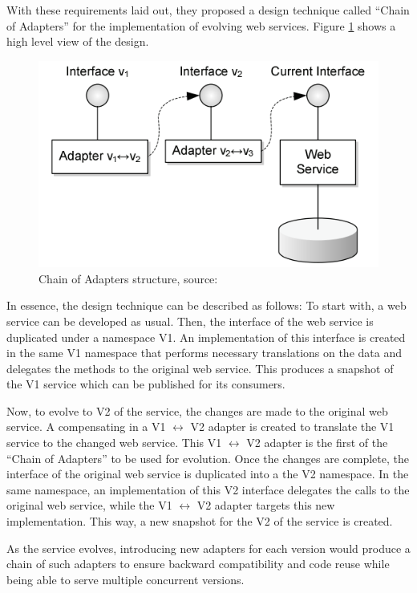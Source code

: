 \documentclass[runningheads,a4paper]{llncs}
\begin{document}
With these requirements laid out, they proposed a design technique called ``Chain of Adapters'' for the implementation of evolving web services. Figure \ref{fig:chain_of_adapters} shows a high level view of the design.

\begin{figure}[ht]
  \centering
  \includegraphics[scale=0.4]{chain_of_adapters.png}
    \caption{Chain of Adapters structure, source: \cite{kaminski2006design}}
  \label{fig:chain_of_adapters}
\end{figure}

In essence, the design technique can be described as follows: To start with, a web service can be developed as usual. Then, the interface of the web service is duplicated under a namespace V1. An implementation of this interface is created in the same V1 namespace that performs necessary translations on the data and delegates the methods to the original web service. This produces a snapshot of the V1 service which can be published for its consumers.

Now, to evolve to V2 of the service, the changes are made to the original web service. A compensating in a V1 $\leftrightarrow$ V2 adapter is created to translate the V1 service to the changed web service. This V1 $\leftrightarrow$ V2 adapter is the first of the ``Chain of Adapters'' to be used for evolution. Once the changes are complete, the interface of the original web service is duplicated into a the V2 namespace. In the same namespace, an implementation of this V2 interface delegates the calls to the original web service, while the V1 $\leftrightarrow$ V2 adapter targets this new implementation. This way, a new snapshot for the V2 of the service is created.

As the service evolves, introducing new adapters for each version would produce a chain of such adapters to ensure backward compatibility and code reuse while being able to serve multiple concurrent versions.
\end{document}
